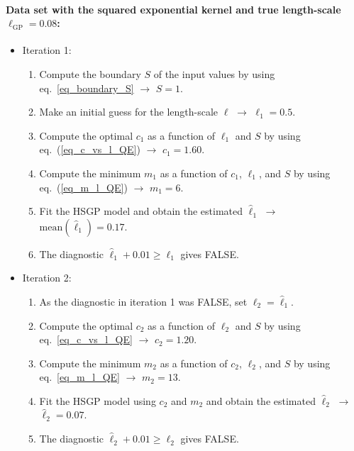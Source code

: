 \paragraph*{Data set with the squared exponential kernel and true length-scale $\ell_{\text{GP}} = 0.08$:} 
\begin{itemize}
\item[] Iteration 1:
	\begin{enumerate}
	\item Compute the boundary $S$ of the input values by using eq.~\eqref{eq_boundary_S} $\to$ $S=1$.
	\item Make an initial guess for the length-scale $\ell$ $\to$ $\ell_1=0.5$.
	
	\item Compute the optimal $c_1$ as a function of $\ell_1$ and $S$ by using eq.~(\ref{eq_c_vs_l_QE}) $\to$ $c_1=1.60$.
	
	\item Compute the minimum $m_1$ as a function of $c_1$, $\ell_1$, and $S$ by using eq.~(\ref{eq_m_l_QE}) $\to$ $m_1=6$.
	
	\item Fit the HSGP model and obtain the estimated $\hat{\ell}_1$  $\to$ $\text{mean}(\hat{\ell}_1)=0.17$.
	
	\item The diagnostic $\hat{\ell}_1 + 0.01 \geq \ell_1$ gives FALSE.

	\end{enumerate}
	
\item[] Iteration 2:
	\begin{enumerate}
	\item As the diagnostic in iteration 1 was FALSE, set $\ell_2 = \hat{\ell}_1$.
	
	\item Compute the optimal $c_2$ as a function of $\ell_2$ and $S$ by using eq.~\eqref{eq_c_vs_l_QE} $\to$ $c_2=1.20$.
	
	\item Compute the minimum $m_2$ as a function of $c_2$, $\ell_2$, and $S$ by using eq.~\eqref{eq_m_l_QE} $\to$ $m_2=13$.
	
	\item Fit the HSGP model using $c_2$ and $m_2$ and obtain the estimated $\hat{\ell}_2$ $\to$ $\hat{\ell}_2=0.07$.
	
	\item The diagnostic $\hat{\ell}_2 + 0.01 \geq \ell_2$ gives FALSE.
	\end{enumerate}
	

\end{itemize}
